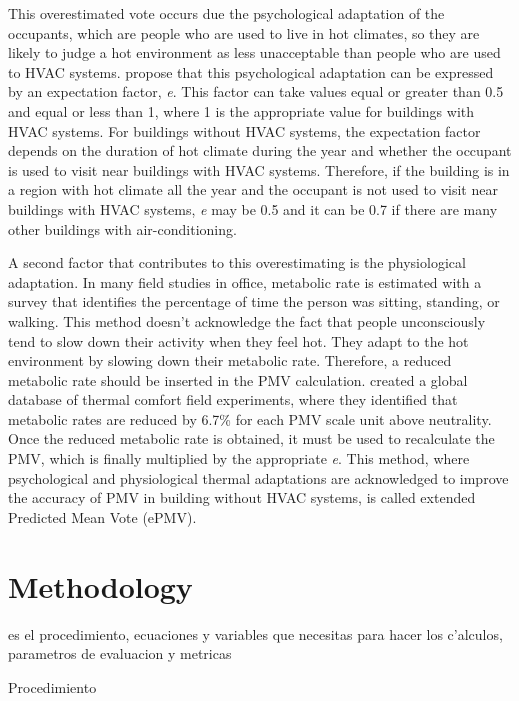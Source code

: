 This overestimated vote occurs due the psychological adaptation of the occupants, which are people who are used to live in hot climates, so they are likely to judge a hot environment as less unacceptable than people who are used to HVAC systems. \citep{fanger2002extension} propose that this psychological adaptation can be expressed by an expectation factor, \textit{e}. This factor can take values equal or greater than 0.5 and equal or less than 1, where 1 is the appropriate value for buildings with HVAC systems. For buildings without HVAC systems, the expectation factor depends on the duration of hot climate during the year and whether the occupant is used to visit near buildings with HVAC systems. Therefore, if the building is in a region with hot climate all the year and the occupant is not used to visit near buildings with HVAC systems, \textit{e} may be 0.5 and it can be 0.7 if there are many other buildings with air-conditioning. 

A second factor that contributes to this overestimating is the physiological adaptation. In many field studies in office, metabolic rate is estimated with a survey that identifies the percentage of time the person was sitting, standing, or walking. This method doesn't acknowledge the fact that people unconsciously tend to slow down their activity when they feel hot. They adapt to the hot environment by slowing down their metabolic rate. Therefore, a reduced metabolic rate should be inserted in the PMV calculation. \cite{} created a global database of thermal comfort field experiments, where they identified that metabolic rates are reduced by 6.7\% for each PMV scale unit above neutrality. Once the reduced metabolic rate is obtained, it must be used to recalculate the PMV, which is finally multiplied by the appropriate \textit{e}. This method, where psychological and physiological thermal adaptations are acknowledged to improve the accuracy of PMV in building without HVAC systems, is called extended Predicted Mean Vote (ePMV).


\chapter{Methodology}


es el procedimiento, ecuaciones y variables que necesitas para hacer los c'alculos, parametros de evaluacion y metricas

Procedimiento

